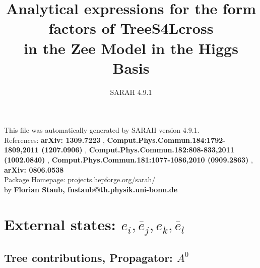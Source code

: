 \documentclass[A4,landscape]{article}
\begin{document}
\title{Analytical expressions for the form factors of TreeS4Lcross\\ in the Zee Model in the Higgs Basis } 
 \author{SARAH 4.9.1} 
 \maketitle 
 \vspace{10cm} 
This file was automatically generated by SARAH version 4.9.1.  \\ 
References: {\bf arXiv: 1309.7223 }, {\bf Comput.Phys.Commun.184:1792-1809,2011 (1207.0906) }, {\bf Comput.Phys.Commun.182:808-833,2011 (1002.0840) }, {\bf Comput.Phys.Commun.181:1077-1086,2010 (0909.2863) }, {\bf arXiv: 0806.0538 } \\ 
Package Homepage: projects.hepforge.org/sarah/ \\ 
by {\bf Florian Staub, fnstaub@th.physik.uni-bonn.de} 
 \pagebreak 
 \tableofcontents 
 \pagebreak 
\section{External states: ${e_{{i}}, \bar{e}_{{j}}, e_{{k}}, \bar{e}_{{l}}}$} 
\subsection{Tree contributions, Propagator: $A^0$} 
\end{document}
